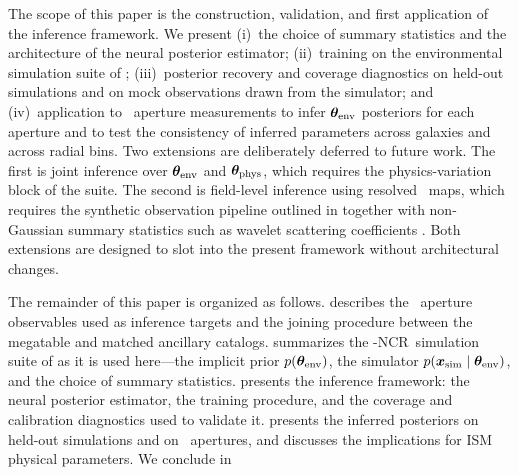 The scope of this paper is the construction, validation, and first
application of the inference framework. We present (i)~the choice of
summary statistics and the architecture of the neural posterior
estimator; (ii)~training on the environmental simulation suite of
; (iii)~posterior recovery and coverage
diagnostics on held-out simulations and on mock observations drawn
from the simulator; and (iv)~application to \PHANGS\ aperture
measurements to infer $\boldsymbol{\theta}_{\rm env}$ posteriors for each aperture and to
test the consistency of inferred parameters across galaxies and
across radial bins. Two extensions are deliberately deferred to future
work. The first is joint inference over $\boldsymbol{\theta}_{\rm env}$ and $\boldsymbol{\theta}_{\rm phys}$,
which requires the physics-variation block of the suite. The second is
field-level inference using resolved \PHANGS\ maps, which requires the
synthetic observation pipeline outlined in
 together with non-Gaussian summary
statistics such as wavelet scattering coefficients
\citep{CITATION_NEEDED_TBD}. Both extensions are designed to slot into the
present framework without architectural changes.

The remainder of this paper is organized as follows.
 describes the \PHANGS\ aperture observables
used as inference targets and the joining procedure between the
megatable and matched ancillary catalogs. 
summarizes the \TIGRESS-NCR\ simulation suite of
 as it is used here---the implicit prior
$p(\boldsymbol{\theta}_{\rm env})$, the simulator $p(\bm{x}_{\rm sim} \mid \boldsymbol{\theta}_{\rm env})$, and
the choice of summary statistics. 
presents the inference framework: the neural posterior estimator, the
training procedure, and the coverage and calibration diagnostics used
to validate it.  presents the inferred
posteriors on held-out simulations and on \PHANGS\ apertures, and
discusses the implications for ISM physical parameters. We conclude
in 
